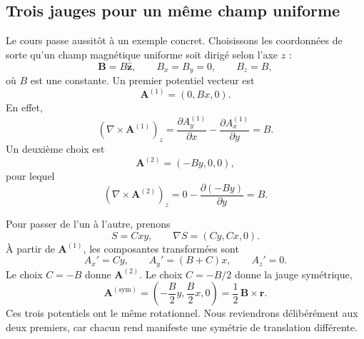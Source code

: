 \subsection{Trois jauges pour un même champ uniforme}

Le cours passe aussitôt à un exemple concret. Choisissons les coordonnées de sorte qu’un champ magnétique uniforme soit dirigé selon l’axe \(z\) :
\begin{equation}
  \mathbf B=B\hat{\mathbf z},
  \qquad
  B_x=B_y=0,
  \qquad
  B_z=B,
\end{equation}
où \(B\) est une constante. Un premier potentiel vecteur est
\begin{equation}
  \mathbf A^{(1)}=(0,Bx,0).
\end{equation}
En effet,
\begin{equation}
  (\nabla\times\mathbf A^{(1)})_z
  =
  \frac{\partial A_y^{(1)}}{\partial x}
  -
  \frac{\partial A_x^{(1)}}{\partial y}
  =B.
\end{equation}
Un deuxième choix est
\begin{equation}
  \mathbf A^{(2)}=(-By,0,0),
\end{equation}
pour lequel
\begin{equation}
  (\nabla\times\mathbf A^{(2)})_z
  =
  0-\frac{\partial(-By)}{\partial y}
  =B.
\end{equation}

Pour passer de l’un à l’autre, prenons
\begin{equation}
  S=Cxy,
  \qquad
  \nabla S=(Cy,Cx,0).
\end{equation}
À partir de \(\mathbf A^{(1)}\), les composantes transformées sont
\begin{equation}
  A_x'=Cy,
  \qquad
  A_y'=(B+C)x,
  \qquad
  A_z'=0.
\end{equation}
Le choix \(C=-B\) donne \(\mathbf A^{(2)}\). Le choix \(C=-B/2\) donne la jauge symétrique,
\begin{equation}
  \mathbf A^{(\mathrm{sym})}
  =
  \left(-\frac{B}{2}y,\frac{B}{2}x,0\right)
  =
  \frac12\,\mathbf B\times\mathbf r.
\end{equation}
Ces trois potentiels ont le même rotationnel. Nous reviendrons délibérément aux deux premiers, car chacun rend manifeste une symétrie de translation différente.

\begin{classroomqa}
\end{classroomqa}

